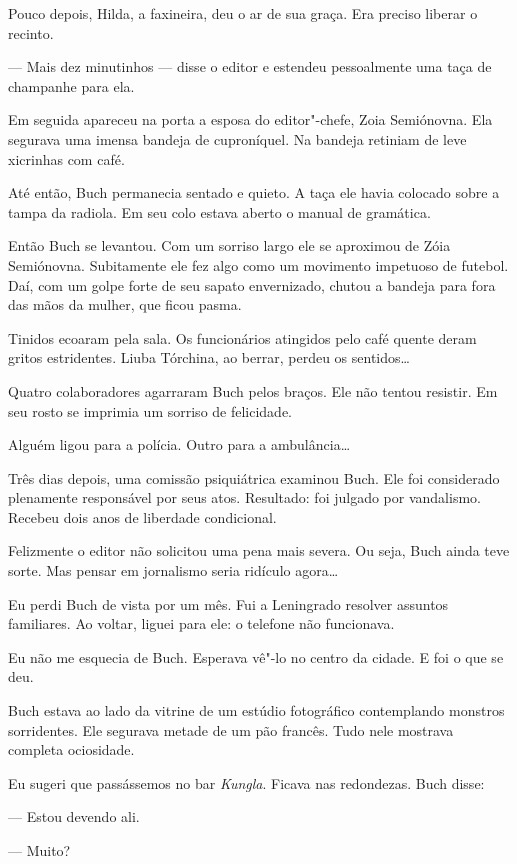 Pouco depois, Hilda, a faxineira, deu o ar de sua graça. Era preciso
liberar o recinto.

--- Mais dez minutinhos --- disse o editor e estendeu pessoalmente uma
taça de champanhe para ela.

Em seguida apareceu na porta a esposa do editor"-chefe, Zoia Semiónovna.
Ela segurava uma imensa bandeja de cuproníquel. Na bandeja retiniam de
leve xicrinhas com café.

Até então, Buch permanecia sentado e quieto. A taça ele havia colocado
sobre a tampa da radiola. Em seu colo estava aberto o manual de
gramática.

Então Buch se levantou. Com um sorriso largo ele se aproximou de Zóia
Semiónovna. Subitamente ele fez algo como um movimento impetuoso de
futebol. Daí, com um golpe forte de seu sapato envernizado, chutou a
bandeja para fora das mãos da mulher, que ficou pasma.

Tinidos ecoaram pela sala. Os funcionários atingidos pelo café quente
deram gritos estridentes. Liuba Tórchina, ao berrar, perdeu os
sentidos\ldots{}

Quatro colaboradores agarraram Buch pelos braços. Ele não tentou
resistir. Em seu rosto se imprimia um sorriso de felicidade.

Alguém ligou para a polícia. Outro para a ambulância\ldots{}

Três dias depois, uma comissão psiquiátrica examinou Buch. Ele foi
considerado plenamente responsável por seus atos. Resultado: foi julgado
por vandalismo. Recebeu dois anos de liberdade condicional.

Felizmente o editor não solicitou uma pena mais severa. Ou seja, Buch
ainda teve sorte. Mas pensar em jornalismo seria ridículo agora\ldots{}

Eu perdi Buch de vista por um mês. Fui a Leningrado resolver assuntos
familiares. Ao voltar, liguei para ele: o telefone não funcionava.

Eu não me esquecia de Buch. Esperava vê"-lo no centro da cidade. E foi o
que se deu.

Buch estava ao lado da vitrine de um estúdio fotográfico contemplando
monstros sorridentes. Ele segurava metade de um pão francês. Tudo nele
mostrava completa ociosidade.

Eu sugeri que passássemos no bar \emph{Kungla}. Ficava nas redondezas.
Buch disse:

--- Estou devendo ali.

--- Muito?

